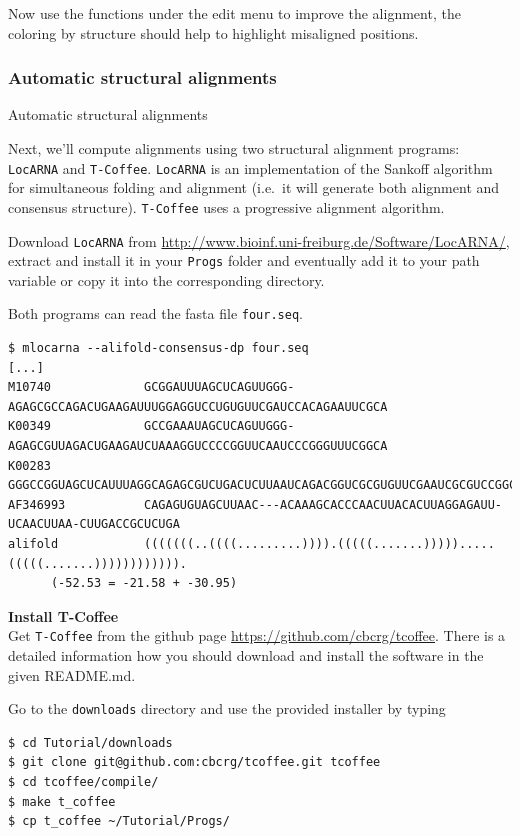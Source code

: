 \documentclass[]{article}
\begin{document}
Now use the functions under the edit menu to improve the alignment, the
coloring by structure should help to highlight misaligned positions.

\subsubsection{Automatic structural alignments}{Automatic structural alignments}\label{automatic-structural-alignments}

Next, we'll compute alignments using two structural alignment programs:
\texttt{LocARNA} and \texttt{T-Coffee}. \texttt{LocARNA} is an
implementation of the Sankoff algorithm for simultaneous folding and
alignment (i.e.~it will generate both alignment and consensus
structure). \texttt{T-Coffee} uses a progressive alignment algorithm.

Download \texttt{LocARNA} from
\url{http://www.bioinf.uni-freiburg.de/Software/LocARNA/}, extract and
install it in your \texttt{Progs} folder and eventually add it to your
path variable or copy it into the corresponding directory.

Both programs can read the fasta file \texttt{four.seq}.

\begin{verbatim}
$ mlocarna --alifold-consensus-dp four.seq
[...]
M10740             GCGGAUUUAGCUCAGUUGGG-AGAGCGCCAGACUGAAGAUUUGGAGGUCCUGUGUUCGAUCCACAGAAUUCGCA
K00349             GCCGAAAUAGCUCAGUUGGG-AGAGCGUUAGACUGAAGAUCUAAAGGUCCCCGGUUCAAUCCCGGGUUUCGGCA
K00283             GGGCCGGUAGCUCAUUUAGGCAGAGCGUCUGACUCUUAAUCAGACGGUCGCGUGUUCGAAUCGCGUCCGGCCCA
AF346993           CAGAGUGUAGCUUAAC---ACAAAGCACCCAACUUACACUUAGGAGAUU-UCAACUUAA-CUUGACCGCUCUGA
alifold            (((((((..((((.........)))).(((((.......))))).....(((((.......)))))))))))).
      (-52.53 = -21.58 + -30.95)
\end{verbatim}

\textbf{Install T-Coffee}\\
Get \texttt{T-Coffee} from the github page
\url{https://github.com/cbcrg/tcoffee}. There is a detailed information
how you should download and install the software in the given README.md.

Go to the \texttt{downloads} directory and use the provided installer by
typing

\begin{verbatim}
$ cd Tutorial/downloads
$ git clone git@github.com:cbcrg/tcoffee.git tcoffee
$ cd tcoffee/compile/
$ make t_coffee
$ cp t_coffee ~/Tutorial/Progs/
\end{verbatim}
\end{document}
